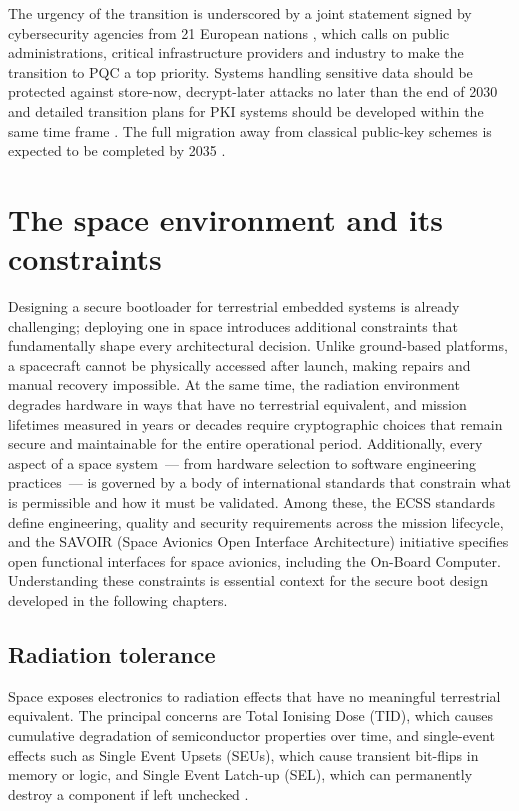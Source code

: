 The urgency of the transition is underscored by a joint statement signed by cybersecurity agencies from 21 European nations \cite{EU_post_quantum_transition}, which calls on public administrations, critical infrastructure providers and industry to make the transition to PQC a top priority. Systems handling sensitive data should be protected against store-now, decrypt-later attacks no later than the end of 2030 and detailed transition plans for PKI systems should be developed within the same time frame \cite{EU_post_quantum_transition, anssi_post_quantum_crypto}. The full migration away from classical public-key schemes is expected to be completed by 2035 \cite{bsi_crypto_key_length}.

\section{The space environment and its constraints}
\label{section:bg-space}

Designing a secure bootloader for terrestrial embedded systems is already challenging; deploying one in space introduces additional constraints that fundamentally shape every architectural decision. Unlike ground-based platforms, a spacecraft cannot be physically accessed after launch, making repairs and manual recovery impossible. At the same time, the radiation environment degrades hardware in ways that have no terrestrial equivalent, and mission lifetimes measured in years or decades require cryptographic choices that remain secure and maintainable for the entire operational period. Additionally, every aspect of a space system~--- from hardware selection to software engineering practices~--- is governed by a body of international standards that constrain what is permissible and how it must be validated. Among these, the ECSS standards define engineering, quality and security requirements across the mission lifecycle, and the SAVOIR (Space Avionics Open Interface Architecture) initiative specifies open functional interfaces for space avionics, including the On-Board Computer. Understanding these constraints is essential context for the secure boot design developed in the following chapters.

\subsection{Radiation tolerance}
\label{section:bg-space-radtol}

Space exposes electronics to radiation effects that have no meaningful terrestrial equivalent. The principal concerns are Total Ionising Dose (TID), which causes cumulative degradation of semiconductor properties over time, and single-event effects such as Single Event Upsets (SEUs), which cause transient bit-flips in memory or logic, and Single Event Latch-up (SEL), which can permanently destroy a component if left unchecked \cite{microchip_rad_tolerant}.

